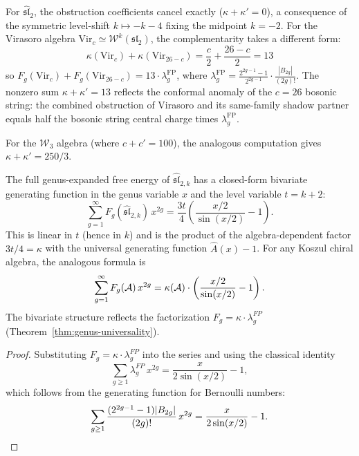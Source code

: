 \begin{remark}\label{rem:sl2-vs-vir-complementarity}
For $\widehat{\mathfrak{sl}}_2$, the obstruction coefficients cancel exactly ($\kappa + \kappa' = 0$), a consequence of the symmetric level-shift $k \mapsto -k-4$ fixing the midpoint $k = -2$.  For the Virasoro algebra $\mathrm{Vir}_c \simeq \mathcal{W}^k(\mathfrak{sl}_2)$, the complementarity takes a different form:
\[
\kappa(\mathrm{Vir}_c) + \kappa(\mathrm{Vir}_{26-c}) = \frac{c}{2} + \frac{26-c}{2} = 13
\]
so $F_g(\mathrm{Vir}_c) + F_g(\mathrm{Vir}_{26-c}) = 13 \cdot \lambda_g^{\mathrm{FP}}$, where $\lambda_g^{\mathrm{FP}} = \frac{2^{2g-1}-1}{2^{2g-1}} \cdot \frac{|B_{2g}|}{(2g)!}$.  The nonzero sum $\kappa + \kappa' = 13$ reflects the conformal anomaly of the $c = 26$ bosonic string: the combined obstruction of Virasoro and its same-family shadow partner equals half the bosonic string central charge times $\lambda_g^{\mathrm{FP}}$.

For the $\mathcal{W}_3$ algebra (where $c + c' = 100$), the analogous computation gives $\kappa + \kappa' = 250/3$.
\end{remark}

\begin{proposition}
\label{prop:bivariate-gf}
The full genus-expanded free energy of $\widehat{\mathfrak{sl}}_{2,k}$ has a closed-form bivariate generating function in the genus variable $x$ and the level variable $t = k + 2$:
\begin{equation}\label{eq:bivariate-gf}
\sum_{g=1}^{\infty} F_g(\widehat{\mathfrak{sl}}_{2,k})\, x^{2g} = \frac{3t}{4}\left(\frac{x/2}{\sin(x/2)} - 1\right).
\end{equation}
This is linear in $t$ (hence in $k$) and is the product of the algebra-dependent factor $3t/4 = \kappa$ with the universal generating function $\hat{A}(x) - 1$.  For any Koszul chiral algebra, the analogous formula is
\begin{equation}\label{eq:bivariate-gf-general}
\sum_{g=1}^{\infty} F_g(\mathcal{A})\, x^{2g} = \kappa(\mathcal{A}) \cdot \left(\frac{x/2}{\sin(x/2)} - 1\right).
\end{equation}
The bivariate structure reflects the factorization $F_g = \kappa \cdot \lambda_g^{FP}$ (Theorem~\ref{thm:genus-universality}).
\end{proposition}

\begin{proof}
Substituting $F_g = \kappa \cdot \lambda_g^{FP}$ into the series and using the classical identity
\[
\sum_{g \geq 1} \lambda_g^{FP}\, x^{2g} = \frac{x}{2\sin(x/2)} - 1,
\]
which follows from the generating function for Bernoulli numbers:
\[
\sum_{g \geq 1} \frac{(2^{2g-1}-1)|B_{2g}|}{(2g)!}\, x^{2g} = \frac{x}{2\sin(x/2)} - 1. \qedhere
\]
\end{proof}

